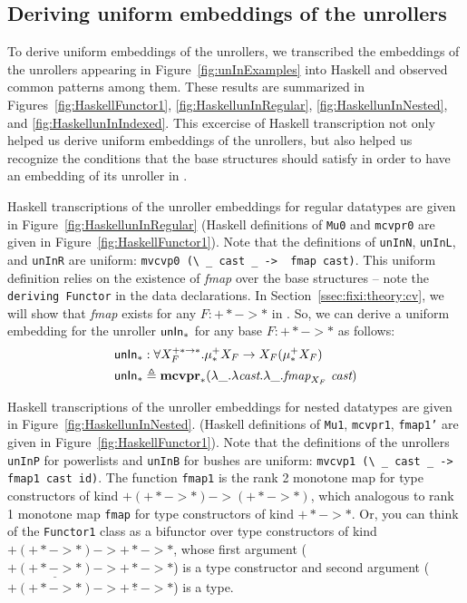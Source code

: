 \subsection{Deriving uniform embeddings of the unrollers}
To derive uniform embeddings of the unrollers, we transcribed the embeddings
of the unrollers appearing in Figure~\ref{fig:unInExamples} into Haskell
and observed common patterns among them. These results are summarized
in Figures~\ref{fig:HaskellFunctor1}, \ref{fig:HaskellunInRegular},
\ref{fig:HaskellunInNested}, and \ref{fig:HaskellunInIndexed}.
This excercise of Haskell transcription not only helped us derive
uniform embeddings of the unrollers, but also helped us recognize
the conditions that the base structures should satisfy in order to
have an embedding of its unroller in \Fixi.

Haskell transcriptions of the unroller embeddings for regular datatypes are
given in Figure~\ref{fig:HaskellunInRegular} (Haskell definitions of
\texttt{Mu0} and \texttt{mcvpr0} are given in Figure~\ref{fig:HaskellFunctor1}).
Note that the definitions of \texttt{unInN}, \texttt{unInL}, and \texttt{unInR}
are uniform: \lstinline$mvcvp0 (\ _ cast _ ->  fmap cast)$.
This uniform definition relies on the existence of \textit{fmap} over
the base structures -- note the \lstinline$deriving Functor$
in the data declarations. In Section~\ref{ssec:fixi:theory:cv},
we will show that \textit{fmap} exists for any $F:+* -> *$ in \Fixi.
So, we can derive a uniform embedding for the unroller $\mathsf{unIn}_{*}$
for any base $F:+* -> *$ as follows:
\begin{align*}
\mathsf{unIn}_{*} &: \forall X_F^{+* -> *}.\mu_{*}^{+}X_F -> X_F(\mu_{*}^{+}X_F) \\
\mathsf{unIn}_{*} &\triangleq \mathbf{mcvpr}_{*} (\lambda\_.\lambda \textit{cast}.\lambda\_.
					\textit{fmap}_{X_F} ~\textit{cast})
\end{align*}

Haskell transcriptions of the unroller embeddings for nested datatypes are
given in Figure~\ref{fig:HaskellunInNested}. (Haskell definitions of
\texttt{Mu1}, \texttt{mcvpr1}, \texttt{fmap1'} are given
in Figure~\ref{fig:HaskellFunctor1}). Note that the definitions of
the unrollers \texttt{unInP} for powerlists and \texttt{unInB} for bushes
are uniform: \lstinline$mvcvp1 (\ _ cast _ ->  fmap1 cast id)$.
The function \texttt{fmap1} is the rank 2 monotone map for type constructors
of kind $+(+* -> *) -> (+* -> *)$, which analogous to rank 1 monotone map
\texttt{fmap} for type constructors of kind $+* -> *$. Or, you can think of 
the \texttt{Functor1} class as a bifunctor over type constructors of kind
$+(+* -> *) -> +* -> *$, whose first argument
($+\underline{(+* -> *)} -> +* -> *$) is a type constructor
and second argument ($+(+* -> *) -> +\underline{*} -> *$) is a type.

